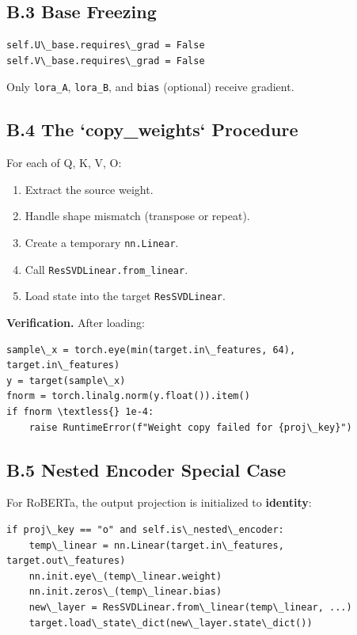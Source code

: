\subsection{B.3 Base Freezing}

\begin{lstlisting}
self.U\_base.requires\_grad = False
self.V\_base.requires\_grad = False
\end{lstlisting}

Only \texttt{lora\_A}, \texttt{lora\_B}, and \texttt{bias} (optional) receive gradient.

\subsection{B.4 The `copy\_weights` Procedure}

For each of Q, K, V, O:

\begin{enumerate}
\item Extract the source weight.
\item Handle shape mismatch (transpose or repeat).
\item Create a temporary \texttt{nn.Linear}.
\item Call \texttt{ResSVDLinear.from\_linear}.
\item Load state into the target \texttt{ResSVDLinear}.

\end{enumerate}
\textbf{Verification.} After loading:

\begin{lstlisting}
sample\_x = torch.eye(min(target.in\_features, 64), target.in\_features)
y = target(sample\_x)
fnorm = torch.linalg.norm(y.float()).item()
if fnorm \textless{} 1e-4:
    raise RuntimeError(f"Weight copy failed for {proj\_key}")
\end{lstlisting}

\subsection{B.5 Nested Encoder Special Case}

For RoBERTa, the output projection is initialized to \textbf{identity}:

\begin{lstlisting}
if proj\_key == "o" and self.is\_nested\_encoder:
    temp\_linear = nn.Linear(target.in\_features, target.out\_features)
    nn.init.eye\_(temp\_linear.weight)
    nn.init.zeros\_(temp\_linear.bias)
    new\_layer = ResSVDLinear.from\_linear(temp\_linear, ...)
    target.load\_state\_dict(new\_layer.state\_dict())
\end{lstlisting}

